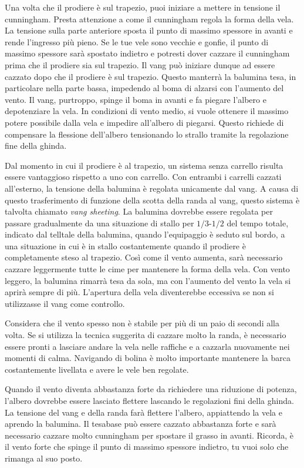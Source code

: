 Una volta che il prodiere è sul trapezio, puoi iniziare a mettere in tensione il
cunningham. Presta attenzione a come il cunningham regola la forma della vela.
La tensione sulla parte anteriore sposta il punto di massimo spessore in avanti
e rende l'ingresso più pieno. Se le tue vele sono vecchie e gonfie, il punto di
massimo spessore sarà spostato indietro e potresti dover cazzare il cunningham
prima che il prodiere sia sul trapezio. Il vang può iniziare dunque ad essere
cazzato dopo che il prodiere è sul trapezio. Questo manterrà la balumina tesa,
in particolare nella parte bassa, impedendo al boma di alzarsi con l'aumento del
vento. Il vang, purtroppo, spinge il boma in avanti e fa piegare l'albero e
depotenziare la vela. In condizioni di vento medio, si vuole ottenere il massimo
potere possibile dalla vela e impedire all'albero di piegarsi. Questo richiede
di compensare la flessione dell'albero tensionando lo strallo tramite la
regolazione fine della ghinda.

Dal momento in cui il prodiere è al trapezio, un sistema senza carrello risulta
essere vantaggioso rispetto a uno con carrello. Con entrambi i carrelli cazzati
all'esterno, la tensione della balumina è regolata unicamente dal vang. A causa
di questo trasferimento di funzione della scotta della randa al vang, questo
sistema è talvolta chiamato \emph{vang sheeting}. La balumina dovrebbe essere
regolata per passare gradualmente da una situazione di stallo per $1/3$-$1/2$
del tempo totale, indicato dal telltale della balumina, quando l'equipaggio è
seduto sul bordo, a una situazione in cui è in stallo costantemente quando il
prodiere è completamente steso al trapezio. Così come il vento aumenta, sarà
necessario cazzare leggermente tutte le cime per mantenere la forma della vela.
Con vento leggero, la balumina rimarrà tesa da sola, ma con l'aumento del vento
la vela si aprirà sempre di più. L'apertura della vela diventerebbe eccessiva se
non si utilizzasse il vang come controllo.

Considera che il vento spesso non è stabile per più
di un paio di secondi alla volta. Se si utilizza la tecnica suggerita di cazzare molto
la randa, è necessario essere pronti a lasciare andare la vela nelle
raffiche e a cazzarla nuovamente nei momenti di calma. Navigando di bolina è
molto importante mantenere la barca costantemente livellata e avere le vele ben
regolate.

Quando il vento diventa abbastanza forte da richiedere una riduzione
di potenza, l'albero dovrebbe essere lasciato flettere lascando le regolazioni
fini della ghinda. La tensione del
vang e della randa farà flettere l'albero, appiattendo la vela e
aprendo la balumina. Il tesabase può essere cazzato abbastanza forte e sarà
necessario cazzare molto cunningham per spostare il grasso in avanti. Ricorda, è
il vento forte che spinge il punto di massimo spessore indietro, tu vuoi solo
che rimanga al suo posto.

